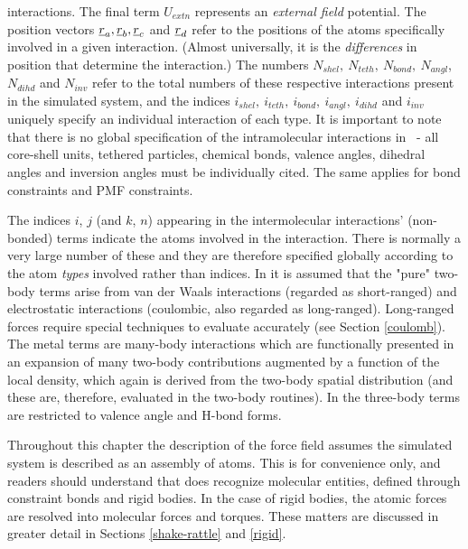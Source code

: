 interactions.  The final term $U_{extn}$ represents an {\em
external field} potential.
The position vectors $\mbox{$\underline{r}$}_{a},\mbox{$\underline{r}$}_{b},\mbox{$\underline{r}$}_{c}$ and $\mbox{$\underline{r}$}_{d}$
refer to the positions of the atoms specifically involved in a given
interaction. (Almost universally, it is the {\em differences} in
position that determine the interaction.)  The numbers
$N_{shel},~N_{teth},~N_{bond},~N_{angl}$, $N_{dihd}$ and $N_{inv}$
refer to the total numbers of these respective interactions present
in the simulated system, and the indices
$i_{shel},~i_{teth},~i_{bond},~i_{angl},~i_{dihd}$ and $i_{inv}$
uniquely specify an individual interaction of each type.  It is
important to note that there is no global specification of the
intramolecular interactions in \D~- all core-shell units, tethered
particles, chemical bonds, valence angles, dihedral angles and
inversion angles must be individually cited.  The same applies for
bond constraints and PMF
constraints.

The indices $i$, $j$ (and $k$, $n$) appearing in the intermolecular
interactions' (non-bonded) terms
indicate the atoms involved in the interaction.
There is normally a very large number of these and they are
therefore specified globally according to the atom {\em types}
involved rather than indices.  In \D it is assumed that the "pure"
two-body terms arise from van der Waals interactions (regarded as short-ranged) and electrostatic
interactions (coulombic, also regarded as
long-ranged).  Long-ranged forces
require special techniques to evaluate accurately (see Section
\ref{coulomb}).  The metal terms are
many-body interactions which are functionally presented in an expansion of
many two-body contributions augmented by a function of the local density,
which again is derived from the two-body spatial distribution
(and these are, therefore, evaluated in the two-body
routines).  In \D the three-body terms
are restricted to valence angle and
H-bond forms.

Throughout this chapter the description of the force
field assumes the simulated system is described
as an assembly of atoms.  This is for convenience only, and
readers should understand that \D does recognize molecular
entities, defined through constraint bonds
and rigid bodies.  In the case of rigid bodies, the atomic forces
are resolved into molecular forces and torques.  These matters are
discussed in greater detail in Sections \ref{shake-rattle} and \ref{rigid}.

